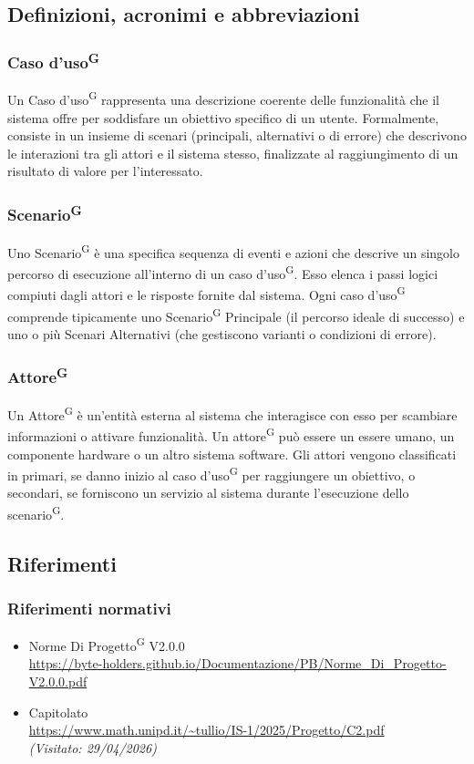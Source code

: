 \documentclass[a4paper, 11pt]{article}
\newcommand{\refterm}[1]{#1\textsuperscript{G}}
\newcommand{\term}[1]{\subsubsection{\refterm{#1}}}
\newcommand{\lastVisited}[3]{\textit{(Visitato: #1/#2/#3)}}
\begin{document}
\subsection{Definizioni, acronimi e abbreviazioni}
\term{Caso d'uso}
Un Caso d'uso\textsuperscript{G} rappresenta una descrizione coerente delle funzionalità che il sistema offre per soddisfare un obiettivo specifico di un utente. Formalmente, consiste in un insieme di scenari (principali, alternativi o di errore) che descrivono le interazioni tra gli attori e il sistema stesso, finalizzate al raggiungimento di un risultato di valore per l'interessato.

\term{Scenario}
Uno Scenario\textsuperscript{G} è una specifica sequenza di eventi e azioni che descrive un singolo percorso di esecuzione all'interno di un caso d'uso\textsuperscript{G}. Esso elenca i passi logici compiuti dagli attori e le risposte fornite dal sistema. Ogni caso d'uso\textsuperscript{G} comprende tipicamente uno Scenario\textsuperscript{G} Principale (il percorso ideale di successo) e uno o più Scenari Alternativi (che gestiscono varianti o condizioni di errore).

\term{Attore}
Un Attore\textsuperscript{G} è un'entità esterna al sistema che interagisce con esso per scambiare informazioni o attivare funzionalità. Un attore\textsuperscript{G} può essere un essere umano, un componente hardware o un altro sistema software. Gli attori vengono classificati in primari, se danno inizio al caso d'uso\textsuperscript{G} per raggiungere un obiettivo, o secondari, se forniscono un servizio al sistema durante l'esecuzione dello scenario\textsuperscript{G}.

\subsection{Riferimenti}
\subsubsection{Riferimenti normativi}
\begin{itemize}
	\item
		Norme Di Progetto\textsuperscript{G} V2.0.0\\
		\url{https://byte-holders.github.io/Documentazione/PB/Norme_Di_Progetto-V2.0.0.pdf}
	\item
		Capitolato\\
		\url{https://www.math.unipd.it/~tullio/IS-1/2025/Progetto/C2.pdf}\\
		\lastVisited{29}{04}{2026}
\end{itemize}
\end{document}
